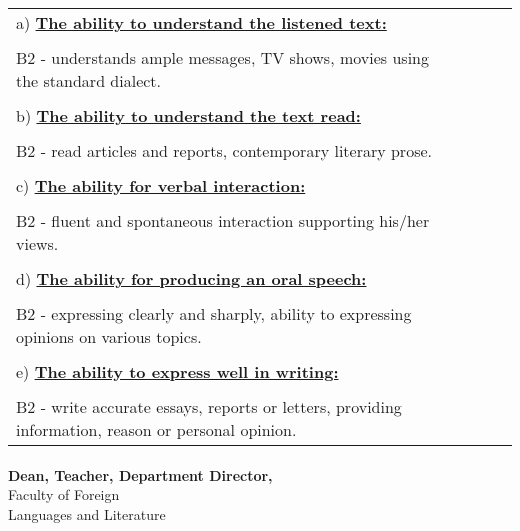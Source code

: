\documentclass[a4paper,9pt,final]{scrartcl}
\begin{document}
\begin{tabular}{llcll}
a) \textbf {\underline{The ability to understand the listened text:}} \\
\vspace{1em}
\\
B2 - understands ample messages, TV shows, movies using the standard dialect. \\
\vspace{1em}
\\
b) \textbf {\underline{The ability to understand the text read:}} \\
\vspace{1em}
\\
B2 - read articles and reports, contemporary literary prose. \\
\vspace{1em}
\\
c) \textbf {\underline{The ability for verbal interaction:}} \\
\vspace{1em}
\\
B2 - fluent and spontaneous interaction supporting his/her views. \\
\vspace{1em}
\\
d) \textbf {\underline{The ability for producing an oral speech:}}\\
\vspace{1em}
\\
B2 - expressing clearly and sharply, ability to expressing opinions on various topics. \\
\vspace{1em}
\\
e) \textbf {\underline{The ability to express well in writing:}} \\
\vspace{1em}
\\
B2 - write accurate essays, reports or letters, providing information, reason or personal opinion. \\
\end{tabular}

\vspace{50pt}
\paragraph{}
\begin{Large}
	\textbf{Dean,  \hspace{9em} Teacher,  \hspace{9em} Department Director,}\\
	Faculty of Foreign \\ Languages and Literature
	
\end{Large}
	
\end{document}
